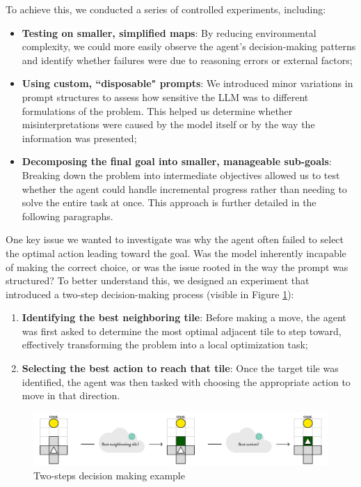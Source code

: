 To achieve this, we conducted a series of controlled experiments, including:
\begin{itemize}
  \item \textbf{Testing on smaller, simplified maps}: By reducing environmental complexity,
    we could more easily observe the agent's decision-making patterns and
    identify whether failures were due to reasoning errors or external factors;

  \item \textbf{Using custom, ``disposable" prompts}: We introduced minor variations
    in prompt structures to assess how sensitive the LLM was to different formulations
    of the problem. This helped us determine whether misinterpretations were
    caused by the model itself or by the way the information was presented;

  \item \textbf{Decomposing the final goal into smaller, manageable sub-goals}: Breaking
    down the problem into intermediate objectives allowed us to test whether the
    agent could handle incremental progress rather than needing to solve the entire
    task at once. This approach is further detailed in the following paragraphs.
\end{itemize}

One key issue we wanted to investigate was why the agent often failed to select the
optimal action leading toward the goal. Was the model inherently incapable of
making the correct choice, or was the issue rooted in the way the prompt was structured?
To better understand this, we designed an experiment that introduced a two-step decision-making
process (visible in Figure \ref{fig:extra}):
\begin{enumerate}
  \item \textbf{Identifying the best neighboring tile}: Before making a move,
    the agent was first asked to determine the most optimal adjacent tile to
    step toward, effectively transforming the problem into a local optimization task;

  \item \textbf{Selecting the best action to reach that tile}: Once the target tile
    was identified, the agent was then tasked with choosing the appropriate
    action to move in that direction.
\end{enumerate}

\vspace{7mm}
\begin{figure}[h!]
  \centering
  \includegraphics[width=\textwidth]{images/agent_development/extra.pdf}
  \caption{Two-steps decision making example}
  \label{fig:extra}
\end{figure}
\vspace{7mm}

